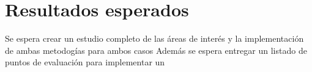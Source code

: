 \documentclass{udparticle}
\begin{document}
\section{Resultados esperados}

Se espera crear un estudio completo de las áreas de interés y la implementación de ambas metodogías para ambos casos
Además se espera entregar un listado de puntos de evaluación para implementar un 



  
% 


 
\end{document}
